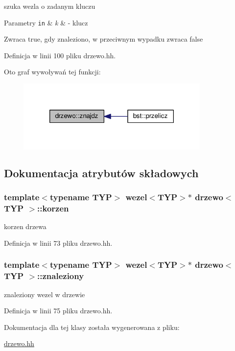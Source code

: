 szuka wezla o zadanym kluczu 


\begin{DoxyParams}[1]{Parametry}
\mbox{\tt in}  & {\em k} & -\/ klucz \\
\hline
\end{DoxyParams}
\begin{DoxyReturn}{Zwraca}
true, gdy znaleziono, w przeciwnym wypadku zwraca false 
\end{DoxyReturn}


Definicja w linii 100 pliku drzewo.\-hh.



Oto graf wywoływań tej funkcji\-:\nopagebreak
\begin{figure}[H]
\begin{center}
\leavevmode
\includegraphics[width=270pt]{classdrzewo_ad9d512467919623595126d88bdb60974_icgraph}
\end{center}
\end{figure}




\subsection{Dokumentacja atrybutów składowych}
\hypertarget{classdrzewo_a8c5c1104e4e6e327ffe7091e96528bf5}{
\subsubsection[{korzen}]{\setlength{\rightskip}{0pt plus 5cm}template$<$typename T\-Y\-P$>$ {\bf wezel}$<$T\-Y\-P$>$$\ast$ {\bf drzewo}$<$ T\-Y\-P $>$\-::korzen}}\label{classdrzewo_a8c5c1104e4e6e327ffe7091e96528bf5}


korzen drzewa 



Definicja w linii 73 pliku drzewo.\-hh.

\hypertarget{classdrzewo_a5c5ca950d7ee79f135c50bd33dba3745}{
\subsubsection[{znaleziony}]{\setlength{\rightskip}{0pt plus 5cm}template$<$typename T\-Y\-P$>$ {\bf wezel}$<$T\-Y\-P$>$$\ast$ {\bf drzewo}$<$ T\-Y\-P $>$\-::znaleziony}}\label{classdrzewo_a5c5ca950d7ee79f135c50bd33dba3745}


znaleziony wezel w drzewie 



Definicja w linii 75 pliku drzewo.\-hh.



Dokumentacja dla tej klasy została wygenerowana z pliku\-:\begin{DoxyCompactItemize}
\item 
\hyperlink{drzewo_8hh}{drzewo.\-hh}\end{DoxyCompactItemize}
